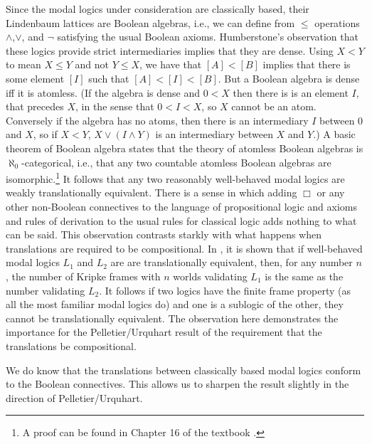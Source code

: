 Since the modal logics under consideration are classically based, their Lindenbaum lattices are Boolean algebras, i.e., we can define from $\le $ operations $\wedge $,$\vee $, and $\neg $ satisfying the usual Boolean axioms. Humberstone's observation that these logics provide strict intermediaries implies that they are dense. Using $X{<}Y$ to mean $X\le Y$ and not $Y\le X$, we have that $[A]{<}[B]$ implies that there is some element $[I]$ such that $[A]{<}[I]{<}[B]$. But a Boolean algebra is dense iff it is atomless. (If the algebra is dense and $0{<}X$ then there is is an element $I$, that precedes $X$, in the sense that $0{<}I{<}X$, so $X$ cannot be an atom. Conversely if the algebra has no atoms, then there is an intermediary $I$ between $0$ and $X$, so if $X{<}Y$, $X\vee (I\wedge Y)$ is an intermediary between $X$ and $Y$.) A basic theorem of Boolean algebra states that the theory of atomless Boolean algebras is $\aleph_0$-categorical, i.e., that any two countable atomless Boolean algebras are isomorphic.\footnote{A proof can be found in Chapter 16 of the textbook \citet{GivantandHalmos}.} It follows that any two reasonably well-behaved modal logics are weakly 
translationally equivalent. There is a sense in which adding $\Box $ or any other non-Boolean connectives to the language of propositional logic and axioms and rules of derivation to the usual rules for classical logic adds nothing to what can be said.  This observation contrasts starkly with what happens when translations are required to be compositional. In \citet{PelletierAndUrquhart}, it is shown that if well-behaved modal logics $L_1$ and $L_2$ are are translationally equivalent, then, for any number $n$, the number of Kripke frames with $n$ worlds validating $L_1$ is the same as the number validating $L_2$. It follows if two logics have the finite frame property (as all the most familiar modal logics do) and one is a sublogic of the other, they cannot be translationally equivalent. The observation here demonstrates the importance for the Pelletier/Urquhart result of the requirement that the translations be compositional.

We do know that the translations between classically based modal logics conform to the Boolean connectives. This allows us to sharpen the result slightly in the direction of Pelletier/Urquhart.

